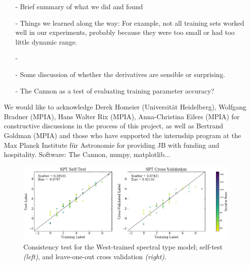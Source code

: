 \documentclass[modern]{aastex62}
\begin{document}
\begin{enumerate}
\item[-] Brief summary of what we did and found

\item[-] Things we learned along the way: For example, not all training sets worked well in our experiments, probably because they were too small or had too little dynamic range.

\item[-] \color{gcolor}{HOGG: Some discussion of precision and accuracy: The Cannon can produce precise results, but is only as accurate as its training set.}\color{black}

\item[-] Some discussion of whether the derivatives are sensible or surprising. \color{red}{Add derivative plots.}\color{black}

\item[-] The Cannon as a test of evaluating training parameter accuracy? 
\end{enumerate}

\acknowledgements
We would like to acknowledge Derek Homeier (Universit{\"a}t Heidelberg), Wolfgang Bradner (MPIA), Hans Walter Rix (MPIA), Anna-Christina Eilers (MPIA) for constructive discussions in the process of this project, as well as Bertrand Goldman (MPIA) and those who have supported the internship program at the Max Planck Institute f{\"u}r Astronomie for providing JB with funding and hospitality. \color{red}Software: The Cannon, numpy, matplotlib... \color{black}

\color{gcolor}{HOGG: SDSS acknowledgments... Grants and stuff...}\color{black}  


\newpage

\begin{figure}[ht]
\begin{center}
\includegraphics[width=18cm]{figures/self_and_validation_test_spt_snr.png}
\end{center}
\caption{Consistency test for the West-trained spectral type model; self-test \textit{(left)}, and leave-one-out cross validation \textit{(right)}.} \label{fig:west_validation}
\end{figure}
\end{document}
